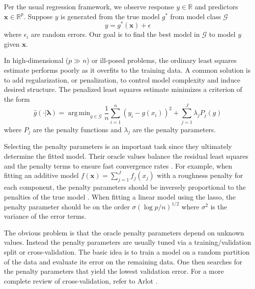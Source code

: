 \documentclass[12pt]{article}
\DeclareMathOperator*{\argmin}{arg\,min}
\begin{document}
Per the usual regression framework, we observe response $y \in \mathbb{R}$ and predictors $\boldsymbol {x} \in \mathbb{R}^p$. Suppose $y$ is generated from the true model $g^*$ from model class $\mathcal{G}$
\begin{equation}
y = g^*(\boldsymbol x) + \epsilon
\end{equation}
where $\epsilon_i$ are random errors. Our goal is to find the best model in $\mathcal{G}$ to model $y$ given $\boldsymbol x$.

In high-dimensional ($p \gg n$) or ill-posed problems, the ordinary least squares estimate performs poorly as it overfits to the training data. A common solution is to add regularization, or penalization, to control model complexity and induce desired structure. The penalized least squares estimate minimizes a criterion of the form
\begin{equation}
\label{intro_train_criterion}
\hat{g}(\cdot | \boldsymbol \lambda) = \argmin_{g\in \mathcal{G}} \frac{1}{n} \sum_{i=1}^n \left (y_i -  g(x_i) \right )^2 + \sum_{j=1}^J \lambda_j P_j(g)
\end{equation}
where $P_j$ are the penalty functions and $\lambda_j$ are the penalty parameters.

Selecting the penalty parameters is an important task since they ultimately determine the fitted model. Their oracle values balance the residual least squares and the penalty terms to ensure fast convergence rates \citep{van2000empirical}. For example, when fitting an additive model $f(\boldsymbol x) = \sum_{j=1}^J f_j(x_j)$ with a roughness penalty for each component, the penalty parameters should be inversely proportional to the penalties of the true model \citep{van2014additive}. When fitting a linear model using the lasso, the penalty parameter should be on the order $\sigma (\log p /n )^{1/2}$ where $\sigma^2$ is the variance of the error terms.

The obvious problem is that the oracle penalty parameters depend on unknown values. Instead the penalty parameters are usually tuned via a training/validation split or cross-validation. The basic idea is to train a model on a random partition of the data and evaluate its error on the remaining data. One then searches for the penalty parameters that yield the lowest validation error. For a more complete review of cross-validation, refer to Arlot \citep{arlot2010survey}.
\end{document}
